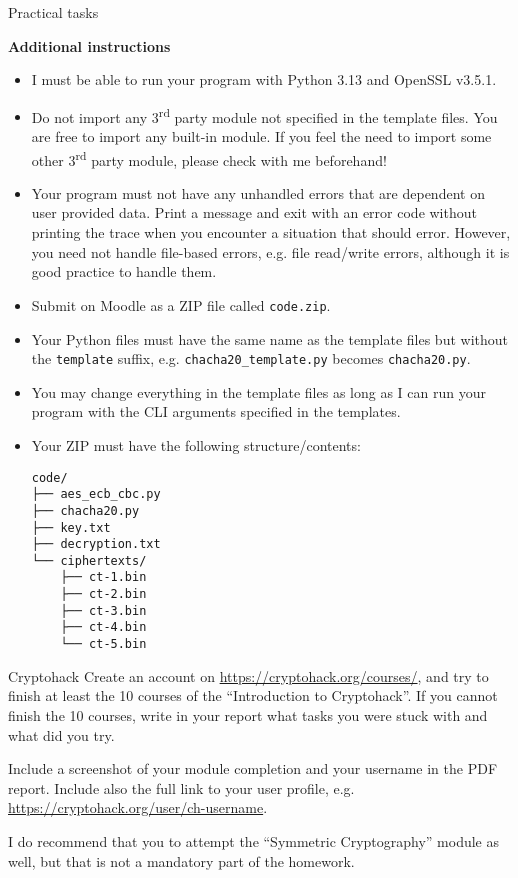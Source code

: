 \documentclass{homework}
\begin{document}
\begin{center}
  Practical tasks
\end{center}

\textbf{Additional instructions}

\begin{itemize}
  \item I must be able to run your program with Python 3.13 and OpenSSL v3.5.1\footnotemark{}.
  \item Do not import any 3\textsuperscript{rd} party module\footnotemark{} not specified in the template files.
  You are free to import any built-in module.
  If you feel the need to import some other 3\textsuperscript{rd} party module, please check with me beforehand!
  \item Your program must not have any unhandled errors that are dependent on user provided data.
  Print a message and exit with an error code without printing the trace when you encounter a situation that should error.
  However, you need not handle file-based errors, e.g. file read/write errors, although it is good practice to handle them.
  \item Submit on Moodle as a ZIP file called \texttt{code.zip}.
  \item Your Python files must have the same name as the template files but without the \texttt{template} suffix, e.g. \texttt{chacha20\_template.py} becomes \texttt{chacha20.py}.
  \item You may change everything in the template files as long as I can run your program with the CLI arguments specified in the templates.
  \item Your ZIP must have the following structure/contents:
  \begin{Verbatim}
code/
├── aes_ecb_cbc.py
├── chacha20.py
├── key.txt
├── decryption.txt
└── ciphertexts/
    ├── ct-1.bin
    ├── ct-2.bin
    ├── ct-3.bin
    ├── ct-4.bin
    └── ct-5.bin
  \end{Verbatim}
\end{itemize}

\begin{task}{Cryptohack}
  Create an account on \url{https://cryptohack.org/courses/}, and try to finish at least the 10 courses of the \enquote{Introduction to Cryptohack}.
  If you cannot finish the 10 courses, write in your report what tasks you were stuck with and what did you try.

  Include a screenshot of your module completion and your username in the PDF report.
  Include also the full link to your user profile, e.g. \url{https://cryptohack.org/user/ch-username}.

  I do recommend that you to attempt the \enquote{Symmetric Cryptography} module as well, but that is not a mandatory part of the homework.
\end{task}
\end{document}
